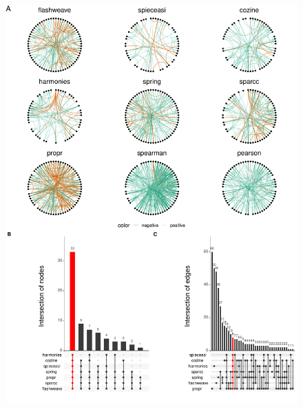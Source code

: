 \documentclass[letterpaper,12pt]{article}
\providecommand{\DIFaddbeginFL}{} %
\providecommand{\DIFaddendFL}{} %
\providecommand{\DIFdelbeginFL}{} %
\providecommand{\DIFdelendFL}{} %
\newcommand{\DIFscaledelfig}{0.5}
\newlength{\DIFdelgraphicswidth} %
\newlength{\DIFdelgraphicsheight} %
\newcommand{\DIFaddincludegraphics}[2][]{{\color{blue}\fbox{\DIFOincludegraphics[#1]{#2}}}} %
\newcommand{\DIFdelincludegraphics}[2][]{%
\sbox{\DIFdelgraphicsbox}{\DIFOincludegraphics[#1]{#2}}%
\settoboxwidth{\DIFdelgraphicswidth}{\DIFdelgraphicsbox} %
\settoboxtotalheight{\DIFdelgraphicsheight}{\DIFdelgraphicsbox} %
\scalebox{\DIFscaledelfig}{%
\parbox[b]{\DIFdelgraphicswidth}{\usebox{\DIFdelgraphicsbox}\\[-\baselineskip] \rule{\DIFdelgraphicswidth}{0em}}\llap{\resizebox{\DIFdelgraphicswidth}{\DIFdelgraphicsheight}{%
\setlength{\unitlength}{\DIFdelgraphicswidth}%
\begin{picture}(1,1)%
\thicklines\linethickness{2pt} %
{\color[rgb]{1,0,0}\put(0,0){\framebox(1,1){}}}%
{\color[rgb]{1,0,0}\put(0,0){\line( 1,1){1}}}%
{\color[rgb]{1,0,0}\put(0,1){\line(1,-1){1}}}%
\end{picture}%
}\hspace*{3pt}}} %
} %
\DeclareRobustCommand{\DIFaddbeginFL}{\DIFOaddbeginFL \let\includegraphics\DIFaddincludegraphics} %
\DeclareRobustCommand{\DIFaddendFL}{\DIFOaddendFL \let\includegraphics\DIFOincludegraphics} %
\DeclareRobustCommand{\DIFdelbeginFL}{\DIFOdelbeginFL \let\includegraphics\DIFdelincludegraphics} %
\DeclareRobustCommand{\DIFdelendFL}{\DIFOaddendFL \let\includegraphics\DIFOincludegraphics} %
\begin{document}
  \begin{figure}[H]
    \centering
    \DIFdelbeginFL %
\DIFdelendFL \DIFaddbeginFL \includegraphics[width=\textwidth]{figure5.pdf}
  \DIFaddendFL \end{figure}
\end{document}
